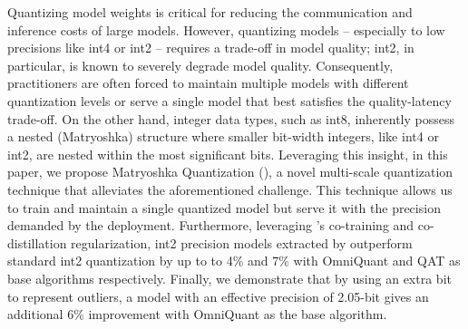 

Quantizing model weights is critical for reducing the communication and inference costs of large models. However, quantizing models -- especially to low precisions like int4 or int2 -- requires a trade-off in model quality; int2, in particular, is known to severely degrade model quality. Consequently, practitioners are often forced to maintain multiple models with different quantization levels or serve a single model that best satisfies the quality-latency trade-off. On the other hand, integer data types, such as int8, inherently possess a nested (Matryoshka) structure where smaller bit-width integers, like int4 or int2, are nested within the most significant bits. Leveraging this insight, in this paper, we propose Matryoshka Quantization (\alg), a novel multi-scale quantization technique that alleviates the aforementioned challenge. This technique allows us to train and maintain a single quantized model but serve it with the precision demanded by the deployment. Furthermore, leveraging \alg's co-training and co-distillation regularization, int2 precision models extracted by \alg outperform standard int2 quantization by up to to 4\% and 7\% with OmniQuant and QAT as base algorithms respectively. Finally, we demonstrate that by using an extra bit to represent outliers, a model with an effective precision of 2.05-bit gives an additional 6\% improvement with OmniQuant as the base algorithm.


